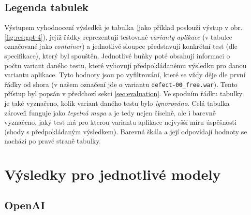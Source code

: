 \documentclass[czech, ma, kiv, he, iso690alph, pdf, viewonly]{fasthesis}
\begin{document}
        \subsection{Legenda tabulek} \label{sec:plot_legend}

        Výstupem vyhodnocení výsledků je tabulka (jako příklad poslouží výstup v obr. \ref{fig:res:gpt-4}), jejíž řádky reprezentují testované \textit{varianty aplikace} (v tabulce označované jako \emph{container}) a jednotlivé sloupce představují konkrétní test (dle specifikace), který byl spouštěn. Jednotlivé buňky poté obsahují informaci o počtu variant daného testu, které vyhovují předpokládanému výsledku pro danou variantu aplikace. Tyto hodnoty jsou po vyfiltrování, které se vždy děje dle první řádky od shora (v našem označení jde o variantu \verb|defect-00_free.war|). Tento přístup byl popsán v předchozí sekci \ref{sec:evaluation}. Ve spodním řádku tabulky je také vyznačeno, kolik variant daného testu bylo \emph{ignorováno}. Celá tabulka zároveň funguje jako \textit{tepelná mapa} a je tedy nejen číselně, ale i barevně vyznačeno, jaký test má pro kterou variantu aplikace nejvyšší míru úspěšnosti (shody s předpokládaným výsledkem). Barevná škála a její odpovídají hodnoty se nachází po pravé straně tabulky.


    \section{Výsledky pro jednotlivé modely}
    
        \subsection{OpenAI}
\end{document}
